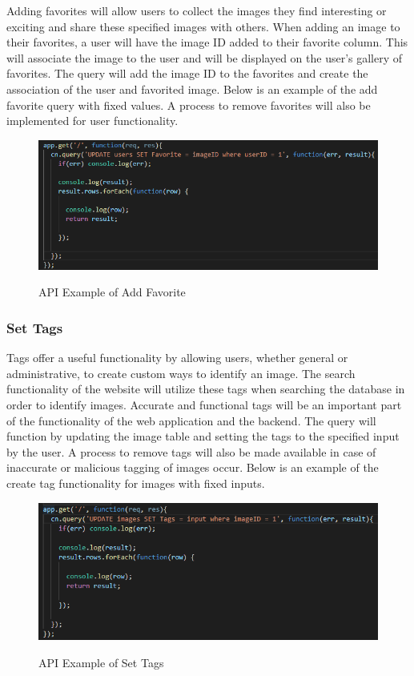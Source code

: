 \documentclass[12pt]{report}
\begin{document}
Adding favorites will allow users to collect the images they find interesting or exciting and share these specified images with others.  When adding an image to their favorites, a user will have the image ID added to their favorite column.  This will associate the image to the user and will be displayed on the user’s gallery of favorites.  The query will add the image ID to the favorites and create the association of the user and favorited image.  Below is an example of the add favorite query with fixed values.  A process to remove favorites will also be implemented for user functionality.

\begin{figure}[h]
	\centering
	\caption{API Example of Add Favorite}
	\includegraphics[scale=0.5]{api_add_favorite}
	\label{fig:API Add Favorite}
\end{figure}

\subsubsection*{Set Tags}

Tags offer a useful functionality by allowing users, whether general or administrative, to create custom ways to identify an image.  The search functionality of the website will utilize these tags when searching the database in order to identify images.  Accurate and functional tags will be an important part of the functionality of the web application and the backend.  The query will function by updating the image table and setting the tags to the specified input by the user.  A process to remove tags will also be made available in case of inaccurate or malicious tagging of images occur.  Below is an example of the create tag functionality for images with fixed inputs.

\begin{figure}[h]
	\centering
	\caption{API Example of Set Tags}
	\includegraphics[scale=0.5]{api_create_tags}
	\label{fig:API Set Tags}
\end{figure}
\end{document}
